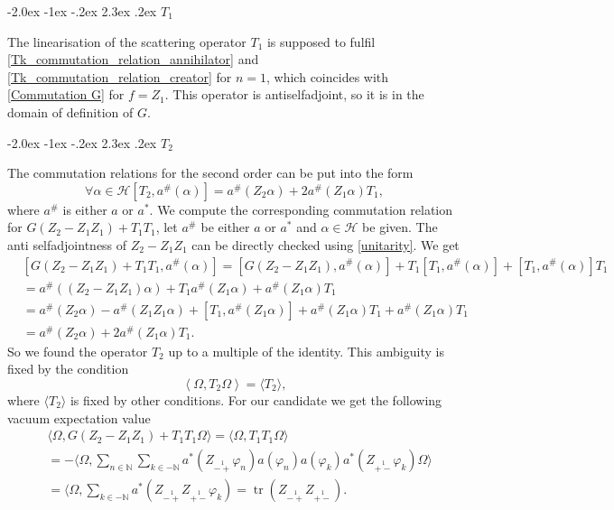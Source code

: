 \documentclass[oneside,reqno,12pt]{amsart}
\makeatletter
\DeclareMathOperator{\tr}{tr}
\renewcommand\section{\@startsection {section}{1}{\z@}%
                                   {-2.0ex \@plus -1ex \@minus -.2ex}%
                                   {2.3ex \@plus.2ex}%
                                   {\normalfont\Large\bfseries}}
\makeatother
\begin{document}
\section{\(T_1\)}

The linearisation of the scattering operator \(T_1\) is supposed to fulfil \eqref{Tk_commutation_relation_annihilator} and \eqref{Tk_commutation_relation_creator} for \(n=1\), which coincides with \eqref{Commutation G} for \(f=Z_1\). This operator is antiselfadjoint, so it is in the domain of definition of \(G\).

\section{\(T_2\)}

The commutation relations for the second order can be put into the form 
\begin{equation}
\forall \alpha \in \mathcal{H} \left[ T_2, a^{\#}(\alpha)\right]= a^{\#}\left( Z_2 \alpha \right) + 2 a^{\#} \left( Z_1 \alpha \right) T_1,
\end{equation}
where \(a^{\#}\) is either \(a\) or \(a^*\). We compute the corresponding commutation relation for \(G(Z_2-Z_1Z_1)+T_1T_1\), let  \(a^{\#}\) be either \(a\) or \(a^*\) and \(\alpha\in\mathcal{H}\) be given. The anti selfadjointness of \(Z_2-Z_1Z_1\) can be directly checked using \eqref{unitarity}.  We get
\begin{align*}
&\left[G(Z_2-Z_1Z_1)+T_1T_1, a^{\#}(\alpha)\right] = \left[G(Z_2-Z_1Z_1), a^{\#}(\alpha)\right] +T_1\left[T_1, a^{\#}(\alpha)\right] +\left[T_1, a^{\#}(\alpha)\right] T_1\\
&= a^{\#}\left( (Z_2-Z_1Z_1)\alpha\right) + T_1 a^{\#}\left(Z_1 \alpha\right) + a^{\#}\left( Z_1 \alpha \right) T_1\\
&=a^{\#}\left( Z_2\alpha\right)-a^{\#}\left( Z_1Z_1\alpha\right) + \left[ T_1,a^{\#}\left(Z_1 \alpha\right)\right] + a^{\#}\left(Z_1 \alpha\right)T_1+a^{\#}\left(Z_1 \alpha\right)T_1\\
&=a^{\#}\left( Z_2\alpha\right)+2a^{\#}\left(Z_1 \alpha\right)T_1
.\end{align*}
So we found the operator \(T_2\) up to a multiple of the identity. This ambiguity is fixed by the condition 
\begin{equation}
\left< \Omega, T_2 \Omega \right>=\langle T_2 \rangle,
\end{equation}
where \(\langle T_2\rangle\) is fixed by other conditions. For our candidate we get the following vacuum expectation value
\begin{align*}
&\langle \Omega, G(Z_2-Z_1Z_1)+T_1T_1\Omega\rangle 
= \langle \Omega, T_1T_1 \Omega\rangle \\
&=-\langle \Omega, \sum_{n\in \mathbb{N}} \sum_{k \in -\mathbb{N}} a^*\left(Z_{\stackrel{1}{-+}}\varphi_n\right) a(\varphi_n) a(\varphi_k) a^* \left( Z_{\stackrel{1}{+-}} \varphi_k\right)\Omega \rangle\\
&=\langle \Omega, \sum_{k\in-\mathbb{N}}a^*\left(Z_{\stackrel{1}{-+}}Z_{\stackrel{1}{+-}}  \varphi_k\right)=\tr \left(Z_{\stackrel{1}{-+}}Z_{\stackrel{1}{+-}} \right).
\end{align*}
\end{document}

